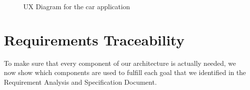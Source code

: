 \documentclass[english]{article}
\begin{document}
\begin{figure}[H]
	\centering
	\caption{UX Diagram for the car application}
\end{figure}

\newpage

\section{Requirements Traceability}
To make sure that every component of our architecture is actually needed, we now show which components are used to fulfill each goal that we identified in the Requirement Analysis and Specification Document.
\end{document}
